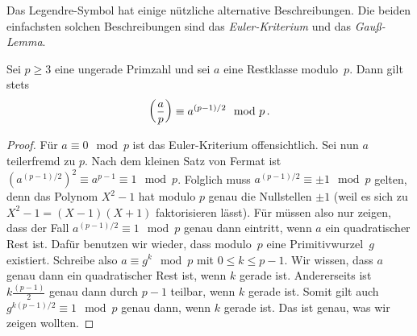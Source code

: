 Das Legendre-Symbol hat einige nützliche alternative Beschreibungen. Die beiden einfachsten solchen Beschreibungen sind das \emph{Euler-Kriterium} und das \emph{Gauß-Lemma}.
\begin{satzmitnamen}
	Sei $p\geqslant 3$ eine ungerade Primzahl und sei $a$ eine Restklasse modulo~$p$. Dann gilt stets
	\begin{equation*}
		\parens*{\frac{a}{p}}\equiv a^{(p-1)/2}\mod p\,.
	\end{equation*}
\end{satzmitnamen}
\begin{proof}
	Für $a\equiv 0\mod p$ ist das Euler-Kriterium offensichtlich. Sei nun $a$ teilerfremd zu $p$. Nach dem kleinen Satz von Fermat ist $(a^{(p-1)/2})^2\equiv a^{p-1}\equiv 1\mod p$. Folglich muss $a^{(p-1)/2}\equiv \pm 1\mod p$ gelten, denn das Polynom $X^2-1$ hat modulo $p$ genau die Nullstellen $\pm 1$ (weil es sich zu $X^2-1=(X-1)(X+1)$ faktorisieren lässt). Für müssen also nur zeigen, dass der Fall $a^{(p-1)/2}\equiv 1\mod p$ genau dann eintritt, wenn $a$ ein quadratischer Rest ist. Dafür benutzen wir wieder, dass modulo~$p$ eine Primitivwurzel~$g$ existiert. Schreibe also $a\equiv g^k\mod p$ mit $0\leqslant k\leqslant p-1$. Wir wissen, dass $a$ genau dann ein quadratischer Rest ist, wenn $k$ gerade ist. Andererseits ist $k\frac{(p-1)}{2}$ genau dann durch $p-1$ teilbar, wenn $k$ gerade ist. Somit gilt auch $g^{k(p-1)/2}\equiv 1\mod p$ genau dann, wenn $k$ gerade ist. Das ist genau, was wir zeigen wollten.
\end{proof}

